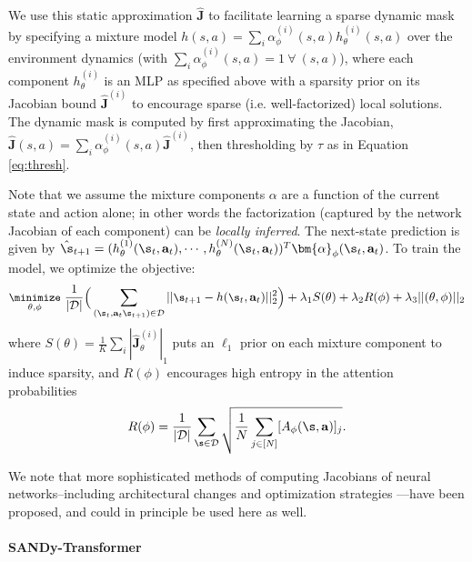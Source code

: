 \documentclass[coda.tex]{subfiles}
\begin{document}
We use this static approximation $\mathbf{\hat J}$ to facilitate learning a sparse dynamic mask by specifying a mixture model $h(s, a) = \sum_i \alpha^{(i)}_\phi(s,a) h^{(i)}_\theta(s,a)$ over the environment dynamics (with $\sum_i \alpha^{(i)}_\phi(s,a) = 1 \ \forall \ (s, a)$), where each component $h^{(i)}_\theta$ is an MLP as specified above with a sparsity prior on its Jacobian bound $\mathbf{\hat J}^{(i)}$ to encourage sparse (i.e. well-factorized) local solutions. The dynamic mask is computed by first approximating the Jacobian, $\mathbf{\hat J}(s,a) = \sum_i \alpha^{(i)}_\phi(s,a)\mathbf{\hat J}^{(i)}$, then thresholding by $\tau$ as in Equation \ref{eq:thresh}.

Note that we assume the mixture components $\alpha$ are a function of the current state and action alone; in other words the factorization (captured by the network Jacobian of each component) can be \emph{locally inferred}.
The next-state prediction is given by $\hat \s_{t+1} = ( h_\theta^{(1)}(\s_t, \mathbf{a}_t), \cdots, h_\theta^{(N)}(\s_t, \mathbf{a}_t))^T \bm{\alpha}_\phi(\s_t, \mathbf{a}_t)$. To train the model, we optimize the objective:
\begin{equation}\label{eq:mixture-mlp}\small
\underset{\theta, \phi}{\minimize} \ 
  \frac{1}{|\mathcal{D}|} \Big( \sum_{(\s_t, \mathbf{a}_t \s_{t+1}) \in \mathcal{D}} ||\s_{t+1} - h(\s_t, \mathbf{a}_t)||_2^2 \Big) 
  + \lambda_1 S(\theta) +  \lambda_2 R(\phi) + \lambda_3 ||(\theta, \phi)||_2
\end{equation}
where $S(\theta) = \frac{1}{K} \sum_i |\hat{\mathbf{J}}_\theta^{(i)}|_1$ puts an $\ell_1$ prior on each mixture component to induce sparsity,
and $R(\phi)$ encourages high entropy in the attention probabilities
\[
  R(\phi) = \frac{1}{|\mathcal{D}|} \sum_{\s \in \mathcal{D}} \sqrt{\frac{1}{N}\sum_{j \in [N]} [A_\phi(\s, \mathbf{a})]_j}.
\]



We note that more sophisticated methods of computing Jacobians of neural networks--including architectural changes and optimization strategies \cite{arjovsky2017wasserstein}---have been proposed, and could in principle be used here as well.

\paragraph{SANDy-Transformer}
\end{document}
